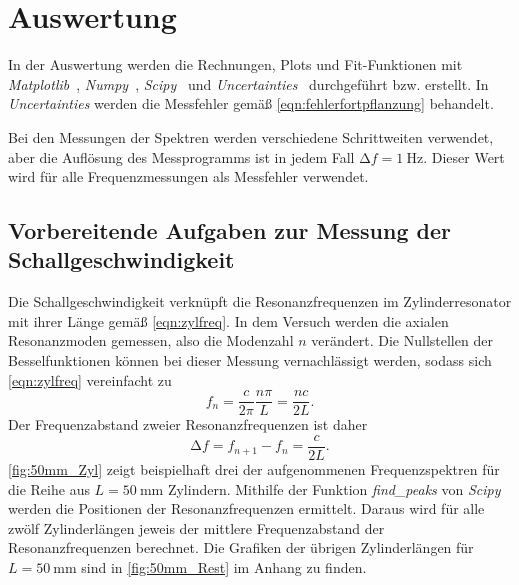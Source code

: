 \section{Auswertung}
\label{sec:Auswertung}
In der Auswertung werden die Rechnungen, Plots und Fit-Funktionen mit \textit{Matplotlib}~\cite{matplotlib}, \textit{Numpy}~\cite{numpy}, \textit{Scipy}~\cite{scipy} und \textit{Uncertainties}~\cite{uncertainties} durchgeführt bzw. erstellt.
In \textit{Uncertainties} werden die Messfehler gemäß \autoref{eqn:fehlerfortpflanzung} behandelt.

\noindent
Bei den Messungen der Spektren werden verschiedene Schrittweiten verwendet, aber die Auflösung des Messprogramms ist in jedem Fall $\increment f = \qty{1}{\hertz}$.
Dieser Wert wird für alle Frequenzmessungen als Messfehler verwendet.
%
%
%
\subsection{Vorbereitende Aufgaben zur Messung der Schallgeschwindigkeit}
Die Schallgeschwindigkeit verknüpft die Resonanzfrequenzen im Zylinderresonator mit ihrer Länge gemäß \autoref{eqn:zylfreq}.
In dem Versuch werden die axialen Resonanzmoden gemessen, also die Modenzahl $n$ verändert.
Die Nullstellen der Besselfunktionen können bei dieser Messung vernachlässigt werden, sodass sich \autoref{eqn:zylfreq} vereinfacht zu
\begin{equation*}
    f_{n} = \frac{c}{2\pi}\frac{n\pi}{L} = \frac{nc}{2L}.
\end{equation*}
Der Frequenzabstand zweier Resonanzfrequenzen ist daher
\begin{equation}
    \increment f = f_{n+1} - f_{n} = \frac{c}{2L}.
    \label{eqn:c_lin}
\end{equation}
\autoref{fig:50mm_Zyl} zeigt beispielhaft drei der aufgenommenen Frequenzspektren für die Reihe aus $L=\qty{50}{\milli\meter}$ Zylindern. 
Mithilfe der Funktion \textit{find\_peaks} von \textit{Scipy}~\cite{scipy} werden die Positionen der Resonanzfrequenzen ermittelt.
Daraus wird für alle zwölf Zylinderlängen jeweis der mittlere Frequenzabstand der Resonanzfrequenzen berechnet.
Die Grafiken der übrigen Zylinderlängen für $L = \qty{50}{\milli\meter}$ sind in \autoref{fig:50mm_Rest} im Anhang zu finden.

